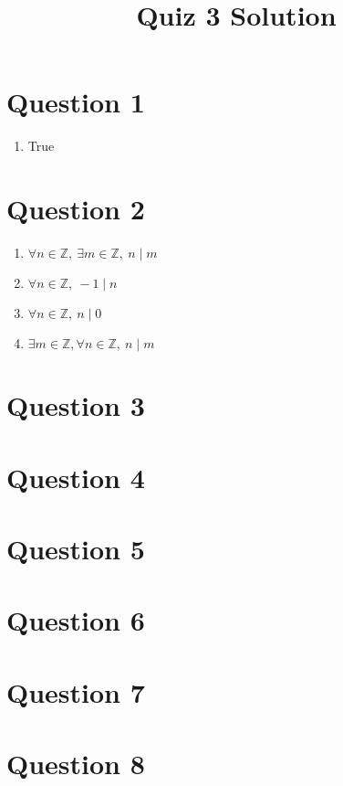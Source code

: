 \documentclass[12pt]{article}
\begin{document}
\title{Quiz 3 Solution}
\maketitle

\section*{Question 1}
\begin{enumerate}
    \item True

\end{enumerate}

\section*{Question 2}
\begin{enumerate}
    \item $\forall n \in \mathbb{Z},\: \exists m \in \mathbb{Z},\: n \mid m$
    \item $\forall n \in \mathbb{Z},\: -1 \mid n$
    \item $\forall n \in \mathbb{Z},\: n \mid 0$
    \item $\exists m \in \mathbb{Z}, \forall n \in \mathbb{Z},\: n \mid m$

\end{enumerate}

\section*{Question 3}

\section*{Question 4}

\section*{Question 5}

\section*{Question 6}

\section*{Question 7}

\section*{Question 8}
\end{document}
